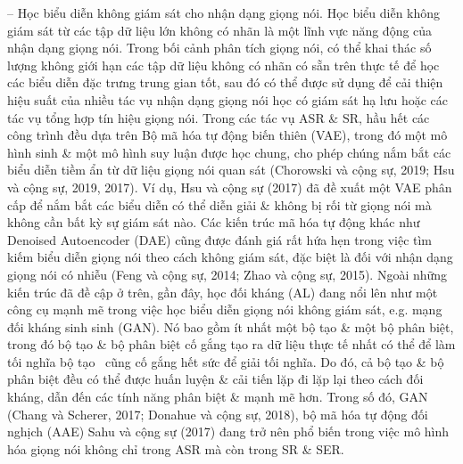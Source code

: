 \documentclass{article}
\begin{document}
\begin{itemize}
\begin{itemize}
\begin{itemize}
            -- Học biểu diễn không giám sát cho nhận dạng giọng nói. Học biểu diễn không giám sát từ các tập dữ liệu lớn không có nhãn là một lĩnh vực năng động của nhận dạng giọng nói. Trong bối cảnh phân tích giọng nói, có thể khai thác số lượng không giới hạn các tập dữ liệu không có nhãn có sẵn trên thực tế để học các biểu diễn đặc trưng trung gian tốt, sau đó có thể được sử dụng để cải thiện hiệu suất của nhiều tác vụ nhận dạng giọng nói học có giám sát hạ lưu hoặc các tác vụ tổng hợp tín hiệu giọng nói. Trong các tác vụ ASR \& SR, hầu hết các công trình đều dựa trên Bộ mã hóa tự động biến thiên (VAE), trong đó một mô hình sinh \& một mô hình suy luận được học chung, cho phép chúng nắm bắt các biểu diễn tiềm ẩn từ dữ liệu giọng nói quan sát (Chorowski và cộng sự, 2019; Hsu và cộng sự, 2019, 2017). Ví dụ, Hsu và cộng sự (2017) đã đề xuất một VAE phân cấp để nắm bắt các biểu diễn có thể diễn giải \& không bị rối từ giọng nói mà không cần bất kỳ sự giám sát nào. Các kiến trúc mã hóa tự động khác như Denoised Autoencoder (DAE) cũng được đánh giá rất hứa hẹn trong việc tìm kiếm biểu diễn giọng nói theo cách không giám sát, đặc biệt là đối với nhận dạng giọng nói có nhiễu (Feng và cộng sự, 2014; Zhao và cộng sự, 2015). Ngoài những kiến trúc đã đề cập ở trên, gần đây, học đối kháng (AL) đang nổi lên như một công cụ mạnh mẽ trong việc học biểu diễn giọng nói không giám sát, e.g. mạng đối kháng sinh sinh (GAN). Nó bao gồm ít nhất một bộ tạo \& một bộ phân biệt, trong đó bộ tạo \& bộ phân biệt cố gắng tạo ra dữ liệu thực tế nhất có thể để làm tối nghĩa bộ tạo \ cũng cố gắng hết sức để giải tối nghĩa. Do đó, cả bộ tạo \& bộ phân biệt đều có thể được huấn luyện \& cải tiến lặp đi lặp lại theo cách đối kháng, dẫn đến các tính năng phân biệt \& mạnh mẽ hơn. Trong số đó, GAN (Chang và Scherer, 2017; Donahue và cộng sự, 2018), bộ mã hóa tự động đối nghịch (AAE) Sahu và cộng sự (2017) đang trở nên phổ biến trong việc mô hình hóa giọng nói không chỉ trong ASR mà còn trong SR \& SER.


\end{itemize}
\end{itemize}
\end{itemize}
\end{document}
